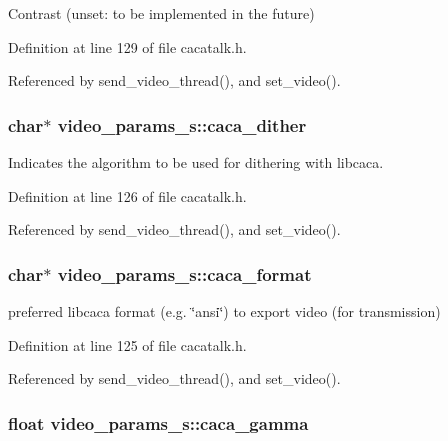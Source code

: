 \-Contrast (unset\-: to be implemented in the future) 



\-Definition at line 129 of file cacatalk.\-h.



\-Referenced by send\-\_\-video\-\_\-thread(), and set\-\_\-video().

\hypertarget{structvideo__params__s_ac064547d5eda8f8516a88922ca28ae5c}{
\subsubsection[{caca\-\_\-dither}]{\setlength{\rightskip}{0pt plus 5cm}char$\ast$ {\bf video\-\_\-params\-\_\-s\-::caca\-\_\-dither}}}\label{structvideo__params__s_ac064547d5eda8f8516a88922ca28ae5c}


\-Indicates the algorithm to be used for dithering with libcaca. 



\-Definition at line 126 of file cacatalk.\-h.



\-Referenced by send\-\_\-video\-\_\-thread(), and set\-\_\-video().

\hypertarget{structvideo__params__s_ab7b86e346f34ccf37397dfd3e6a21128}{
\subsubsection[{caca\-\_\-format}]{\setlength{\rightskip}{0pt plus 5cm}char$\ast$ {\bf video\-\_\-params\-\_\-s\-::caca\-\_\-format}}}\label{structvideo__params__s_ab7b86e346f34ccf37397dfd3e6a21128}


preferred libcaca format (e.\-g. \char`\"{}ansi\char`\"{}) to export video (for transmission) 



\-Definition at line 125 of file cacatalk.\-h.



\-Referenced by send\-\_\-video\-\_\-thread(), and set\-\_\-video().

\hypertarget{structvideo__params__s_a041f29eefbb3860f3b56eb94d96a8f94}{
\subsubsection[{caca\-\_\-gamma}]{\setlength{\rightskip}{0pt plus 5cm}float {\bf video\-\_\-params\-\_\-s\-::caca\-\_\-gamma}}}\label{structvideo__params__s_a041f29eefbb3860f3b56eb94d96a8f94}


